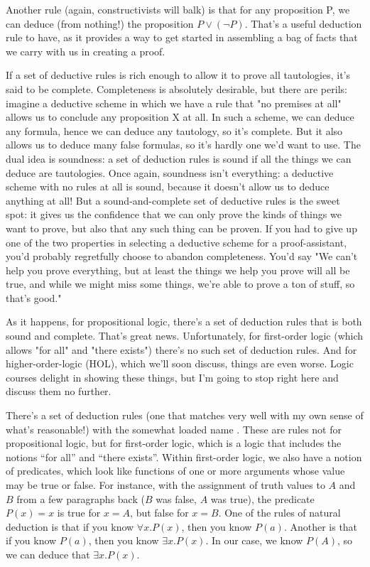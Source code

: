 Another rule (again, constructivists will balk) is that for any proposition P, we can deduce (from nothing!) the proposition $P\vee(\neg P)$. That's a useful deduction rule to have, as it provides a way to get started in assembling a bag of facts that we carry with us in creating a proof.

If a set of deductive rules is rich enough to allow it to prove all tautologies, it's said to be complete. Completeness is absolutely desirable, but there are perils: imagine a deductive scheme in which we have a rule that "no premises at all" allows us to conclude any proposition X at all. In such a scheme, we can deduce any formula, hence we can deduce any tautology, so it's complete. But it also allows us to deduce many false formulas, so it's hardly one we'd want to use. The dual idea is soundness: a set of deduction rules is sound if all the things we can deduce are tautologies. Once again, soundness isn't everything: a deductive scheme with no rules at all is sound, because it doesn't allow us to deduce anything at all! But a sound-and-complete set of deductive rules is the sweet spot: it gives us the confidence that we can only prove the kinds of things we want to prove, but also that any such thing can be proven. If you had to give up one of the two properties in selecting a deductive scheme for a proof-assistant, you'd probably regretfully choose to abandon completeness. You'd say "We can't help you prove everything, but at least the things we help you prove will all be true, and while we might miss some things, we're able to prove a ton of stuff, so that's good." 

As it happens, for propositional logic, there's a set of deduction rules that is both sound and complete. That's great news. Unfortunately, for first-order logic (which allows "for all" and "there exists") there's no such set of deduction rules. And for higher-order-logic (HOL), which we'll soon discuss, things are even worse. Logic courses delight in showing these things, but I'm going to stop right here and discuss them no further. 

There's a set of deduction rules (one that matches very well with my own sense of what's reasonable!) with the somewhat loaded name . These are rules not for propositional logic, but for first-order logic, which is a logic that includes the notions ``for all'' and ``there exists''. Within first-order logic, we also have a notion of predicates, which look like functions of one or more arguments whose value may be true or false. For instance, with the assignment of truth values to $A$ and $B$ from a few paragraphs back ($B$ was false, $A$ was true),  the predicate $P(x) = x$ is true for $x = A$, but false for $x = B$. One of the rules of natural deduction is that if you know $\forall  x . P(x)$, then you know $P(a)$. Another is that if you know $P(a)$, then you know $\exists x . P(x)$. In our case, we know $P(A)$, so we can deduce that $\exists x . P(x)$.

